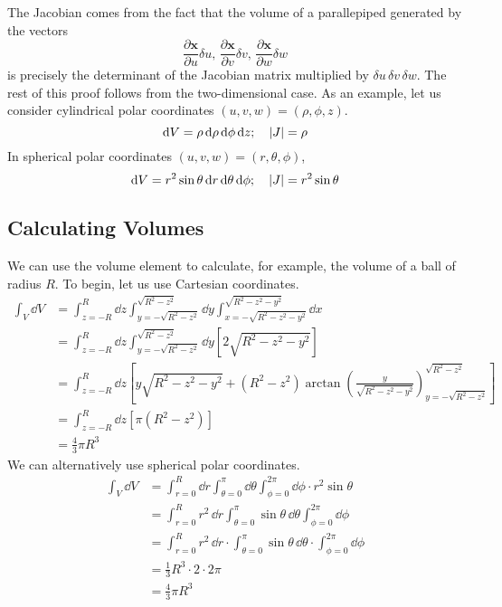 \documentclass{article}
\begin{document}
\noindent The Jacobian comes from the fact that the volume of a parallepiped generated by the vectors
\[ \frac{\partial \bm x}{\partial u} \delta u,\,\frac{\partial \bm x}{\partial v} \delta v,\,\frac{\partial \bm x}{\partial w} \delta w \]
is precisely the determinant of the Jacobian matrix multiplied by $\delta u\,\delta v\,\delta w$. The rest of this proof follows from the two-dimensional case. As an example, let us consider cylindrical polar coordinates $(u, v, w) = (\rho, \phi, z)$.
\[ \dd V = \rho \, \dd \rho \, \dd \phi \, \dd z;\quad \abs{J} = \rho \]
In spherical polar coordinates $(u, v, w) = (r, \theta, \phi)$,
\[ \dd V = r^2 \sin\theta \,\dd r \,\dd \theta \,\dd \phi;\quad \abs{J} = r^2\sin\theta \]

\subsection{Calculating Volumes}
We can use the volume element to calculate, for example, the volume of a ball of radius $R$. To begin, let us use Cartesian coordinates.
\begin{align*}
    \int_V \dd V & = \int_{z=-R}^R \dd z \int_{y = -\sqrt{R^2 - z^2}}^{\sqrt{R^2 - z^2}} \dd y \int_{x = -\sqrt{R^2 - z^2 - y^2}}^{\sqrt{R^2 - z^2 - y^2}} \dd x                               \\
                 & = \int_{z=-R}^R \dd z \int_{y = -\sqrt{R^2 - z^2}}^{\sqrt{R^2 - z^2}} \dd y \left[ 2\sqrt{R^2 - z^2 - y^2} \right]                                                          \\
                 & = \int_{z=-R}^R \dd z \left[ y\sqrt{R^2 - z^2 - y^2} + (R^2 - z^2) \arctan \left( \frac{y}{\sqrt{R^2 - z^2 - y^2}} \right)_{y=-\sqrt{R^2 - z^2}}^{\sqrt{R^2 - z^2}} \right] \\
                 & = \int_{z=-R}^R \dd z \left[ \pi (R^2 - z^2) \right]                                                                                                                        \\
                 & = \frac{4}{3}\pi R^3
\end{align*}
We can alternatively use spherical polar coordinates.
\begin{align*}
    \int_V \dd V & = \int_{r=0}^R \dd r \int_{\theta=0}^\pi \dd \theta \int_{\phi=0}^{2\pi} \dd \phi \cdot r^2 \sin\theta          \\
                 & = \int_{r=0}^R r^2\,\dd r \int_{\theta=0}^\pi \sin\theta\, \dd \theta \int_{\phi=0}^{2\pi} \dd \phi             \\
                 & = \int_{r=0}^R r^2\,\dd r \cdot \int_{\theta=0}^\pi \sin\theta\, \dd \theta \cdot \int_{\phi=0}^{2\pi} \dd \phi \\
                 & = \frac{1}{3}R^3 \cdot 2 \cdot 2 \pi                                                                            \\
                 & = \frac{4}{3}\pi R^3
\end{align*}
\end{document}
